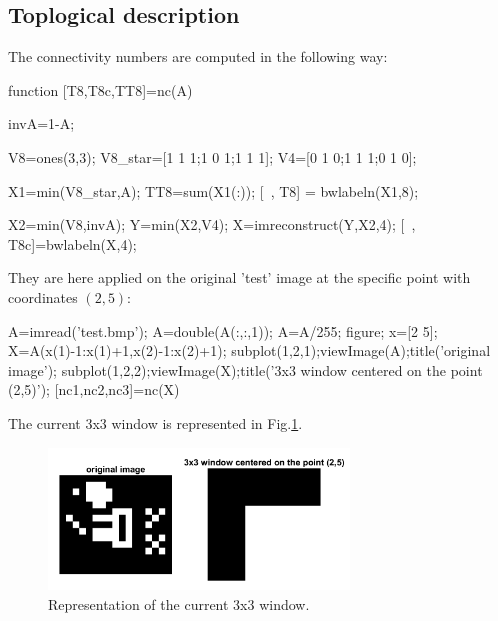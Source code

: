 \def\QRCODE{TB_IPR_TUT.IMG.pixel_topological_description_matlabqrcode.png}
\def\QRPAGE{http://www.iptutorials.science/tree/master/TB_IPR/TUT.IMG.pixel_topological_description/matlab}


\subsection{Toplogical description}
The connectivity numbers are computed in the following way:
\begin{matlab}
function [T8,T8c,TT8]=nc(A)

invA=1-A;

V8=ones(3,3);
V8_star=[1 1 1;1 0 1;1 1 1];
V4=[0 1 0;1 1 1;0 1 0];

X1=min(V8_star,A);
TT8=sum(X1(:));
[~, T8] = bwlabeln(X1,8);

X2=min(V8,invA);
Y=min(X2,V4);
X=imreconstruct(Y,X2,4);
[~, T8c]=bwlabeln(X,4);

\end{matlab}
\noindent They are here applied on the original 'test' image at the specific point with coordinates $(2,5)$:
\begin{matlab}
A=imread('test.bmp');
A=double(A(:,:,1));
A=A/255;
figure;
x=[2 5];
X=A(x(1)-1:x(1)+1,x(2)-1:x(2)+1);
subplot(1,2,1);viewImage(A);title('original image');
subplot(1,2,2);viewImage(X);title('3x3 window centered on the point (2,5)');
[nc1,nc2,nc3]=nc(X)
\end{matlab}

The current 3x3 window is represented in Fig.\ref{fig:topological_description:matlab:3x3window}.

\begin{figure}[htbp]
 \centering
 \includegraphics[width=8cm]{3x3window.png}
 \caption{Representation of the current 3x3 window.}
 \label{fig:topological_description:matlab:3x3window}
\end{figure}

